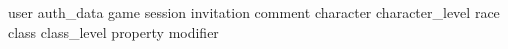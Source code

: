{user}
{auth_data}
{game}
{session}
{invitation}
{comment}
{character}
{character_level}
{race}
{class}
{class_level}
{property}
{modifier}

\emptyString
